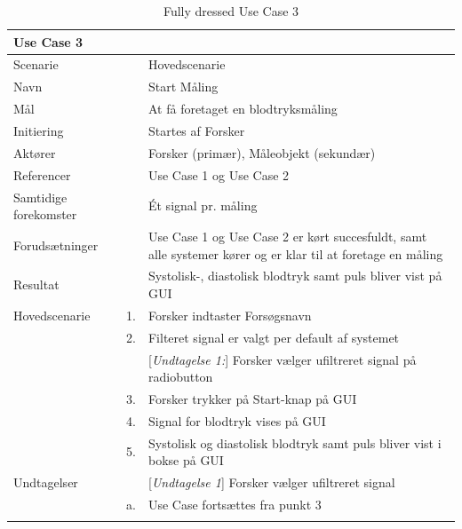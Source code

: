 \begin{longtabu} to  %
    {\large \textbf{Use Case 3}} && \\
    \toprule
    Scenarie && Hovedscenarie\\
    Navn && Start Måling\\
    Mål && At få foretaget en blodtryksmåling\\
    Initiering && Startes af Forsker\\
    Aktører && Forsker (primær), Måleobjekt (sekundær)\\
    Referencer && Use Case 1 og Use Case 2\\
    Samtidige forekomster  && Ét signal pr. måling\\
    Forudsætninger && Use Case 1 og Use Case 2 er kørt succesfuldt, samt alle systemer kører og er klar til at foretage en måling\\ 
    Resultat && Systolisk-, diastolisk blodtryk samt puls bliver vist på GUI\\ \midrule
    Hovedscenarie &    1. &		Forsker indtaster Forsøgsnavn\\[-1ex]
    &     2. & 	Filteret signal er valgt per default af systemet\\	 	
                &    & [\textit{Undtagelse 1:}] Forsker vælger ufiltreret signal på radiobutton	\\
                &    3. & Forsker trykker på Start-knap på GUI\\[-1ex]
                &    4. & Signal for blodtryk vises på GUI\\[-1ex] 
                &    5. & Systolisk og diastolisk blodtryk samt puls bliver vist i bokse på GUI\\ \midrule
                
    Undtagelser && [\textit{Undtagelse 1}]	Forsker vælger ufiltreret signal\\ 
    &	a. & Use Case fortsættes fra punkt 3\\ 
    \bottomrule
\caption{Fully dressed Use Case 3}
\label{UC3}
\end{longtabu}


